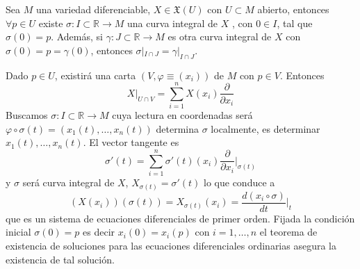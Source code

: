 \begin{prop}
Sea $M$ una variedad diferenciable, $X \in \mathfrak{X}(U)$ con $U \subset M$ abierto, entonces $\forall p \in U$ existe $\sigma: I \subset \mathbb R \longrightarrow M$ una curva integral de $X$ , con $0\in I$, tal que $\sigma(0)=p$. Adem\'as, si $\gamma: J \subset \mathbb{R} \to M$ es otra curva integral de $X$ con $\sigma(0) = p = \gamma(0)$, entonces $\sigma|_{I \cap J} = \gamma|_{I \cap J}$.
\end{prop}
\begin{dem}
Dado $p \in U$, existirá una carta $(V,\varphi\equiv (x_i))$ de $M$ con $p \in V$. Entonces
$$X|_{U \cap V} = \sum_{i=1}^n X(x_i) \frac{\partial}{\partial x_i}$$
Buscamos $\sigma: I \subset \mathbb R \longrightarrow M$ cuya lectura en coordenadas ser\'a $\varphi \circ \sigma(t) = (x_1(t),\dots,x_n(t))$ determina $\sigma$ localmente, es determinar $x_1(t), \ldots, x_n(t)$. El vector tangente es
$$\sigma'(t) = \sum_{i=1}^n \sigma'(t) (x_i) \frac{\partial}{\partial x_i}\Big|_{\sigma(t)}$$
y $\sigma$ ser\'a curva integral de $X$, $X_{\sigma(t)} = \sigma'(t)$ lo que conduce a
$$(X(x_i))(\sigma(t)) =  X_{\sigma(t)}(x_i) = \dfrac{d(x_i\circ \sigma)}{dt} \Big|_t$$
que es un sistema de ecuaciones diferenciales de primer orden. Fijada la condici\'on inicial $\sigma(0)=p$ es decir $x_i(0) = x_i(p)$ con $i=1,\dots,n$ el teorema de existencia de soluciones para las ecuaciones diferenciales ordinarias asegura la existencia de tal soluci\'on.
\end{dem}

